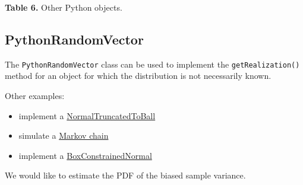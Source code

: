 \documentclass[11pt]{article}
\begin{document}
\textbf{Table 6.} Other Python objects.

    \hypertarget{pythonrandomvector}{%
\subsection{PythonRandomVector}\label{pythonrandomvector}}

The \texttt{PythonRandomVector} class can be used to implement the
\texttt{getRealization()} method for an object for which the
distribution is not necessarily known.

Other examples:
\begin{itemize}
\item implement a
\href{https://github.com/openturns/openturns.github.io/blob/df983978484029a0b9571ca7539483837e8c193f/openturns/1.18/pyplots/PythonRandomVector.py}{NormalTruncatedToBall}
\item simulate a
\href{https://github.com/mbaudin47/otmarkov/blob/efe3c4e9eda2e10d6103ccc028d7518c0d82468d/otmarkov/MarkovChainRandomVector.py}{Markov
chain}
\item implement a
\href{https://openturns.github.io/openturns/latest/auto_calibration/bayesian_calibration/plot_gibbs_simus.html}{BoxConstrainedNormal}
\end{itemize}

    We would like to estimate the PDF of the biased sample variance.
\end{document}
